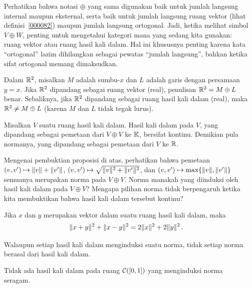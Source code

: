 Perhatikan bahwa notasi $\oplus$ yang sama digunakan baik untuk jumlah langsung internal maupun eksternal,
serta baik untuk jumlah langsung ruang vektor (lihat definisi~\ref{000082}) maupun jumlah langsung ortogonal.
Jadi, ketika melihat simbol $V \oplus W$, penting untuk mengetahui kategori mana yang sedang kita gunakan:
ruang vektor atau ruang hasil kali dalam. Hal ini khususnya penting karena kata ``ortogonal'' lazim dihilangkan
sebagai pewatas ``jumlah langsung'', bahkan ketika sifat ortogonal memang dimaksudkan.

\begin{exam} Dalam $\mathbb{R}^2$, misalkan $M$ adalah sumbu-$x$ dan $L$ adalah garis dengan persamaan $y = x$.
Jika $\mathbb{R}^2$ dipandang sebagai ruang vektor (real), penulisan $\mathbb{R}^2 = M
\oplus L$ benar. Sebaliknya, jika $\mathbb{R}^2$ dipandang sebagai ruang hasil kali dalam (real), maka
$\mathbb{R}^2 \ne M \oplus L$ (karena $M$ dan $L$ tidak tegak lurus).
\end{exam}

\begin{prop} Misalkan $V$ suatu ruang hasil kali dalam. Hasil kali dalam pada $V$, yang dipandang sebagai pemetaan
dari $V \oplus V$ ke $\mathbb{K}$, bersifat kontinu. Demikian pula normanya, yang dipandang sebagai pemetaan dari $V$
ke $\mathbb{R}$.
\end{prop}

Mengenai pembuktian proposisi di atas, perhatikan bahwa pemetaan $(v,v') \mapsto
\lVert v\rVert + \lVert v'\rVert$, $(v,v') \mapsto \sqrt{\lVert v\rVert^2 + \lVert v'\rVert^2}$, dan $(v,v')
\mapsto \max\{\lVert v\rVert, \lVert v'\rVert\}$ semuanya merupakan norma pada $V \oplus V$. Norma manakah yang diinduksi
oleh hasil kali dalam pada $V \oplus V$? Mengapa pilihan norma tidak berpengaruh ketika kita membuktikan
bahwa hasil kali dalam tersebut kontinu?

\begin{prop}\label{parallelogram_law} Jika $x$ dan $y$ merupakan vektor dalam suatu ruang hasil kali
dalam, maka
   \[ \lVert x + y\rVert^2 + \lVert x - y\rVert^2 = 2\lVert x\rVert^2 + 2\lVert y\rVert^2\,. \]
\end{prop}

Walaupun setiap hasil kali dalam menginduksi suatu norma, tidak setiap norma berasal dari hasil kali dalam.

\begin{exam}\label{00015061} Tidak ada hasil kali dalam pada ruang $\mathcal{C}([0,1])$ yang menginduksi norma seragam.
\end{exam}

